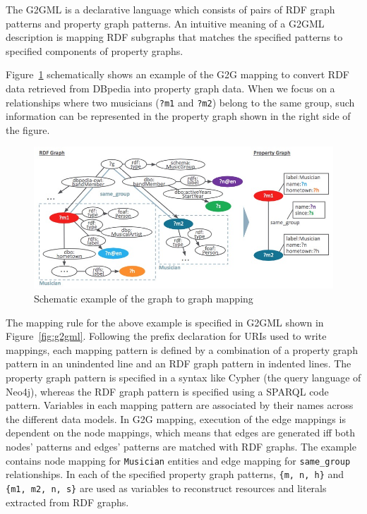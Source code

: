 \documentclass[runningheads]{llncs}
\begin{document}
The G2GML is a declarative language which consists of pairs of RDF graph patterns and property graph patterns. 
An intuitive meaning of a G2GML description is mapping RDF subgraphs that matches the specified patterns to specified components of property graphs. 
 
Figure~\ref{fig:conversion} schematically shows an example of the G2G mapping to convert RDF data retrieved from DBpedia into property graph data. 
When we focus on a relationships where two musicians (\texttt{?m1} and \texttt{?m2}) belong to the same group, such information can be represented in the property graph shown in the right side of the figure.
 
\begin{figure}
\center
\includegraphics[width=1.0\textwidth]{example.jpg}
\caption{Schematic example of the graph to graph mapping}
\label{fig:conversion}
\end{figure}
 
The mapping rule for the above example is specified in G2GML shown in Figure~\ref{fig:g2gml}. Following the prefix declaration for URIs used to write mappings, each mapping pattern is defined by a combination of a property graph pattern in an unindented line and an RDF graph pattern in indented lines. The property graph pattern is specified in a syntax like Cypher (the query language of Neo4j), whereas the RDF graph pattern is specified using a SPARQL code pattern. 
Variables in each mapping pattern are associated by their names across the different data models. 
In G2G mapping, execution of the edge mappings is dependent on the node mappings, which means that edges are generated iff both nodes' patterns and edges' patterns are matched with RDF graphs. 
The example contains node mapping for \texttt{Musician} entities and edge mapping for \texttt{same\_group} relationships.
In each of the specified property graph patterns, \texttt{\{m, n, h\}} and \texttt{\{m1, m2, n, s\}} are used as variables to reconstruct resources and literals extracted from RDF graphs. 
 
\end{document}
